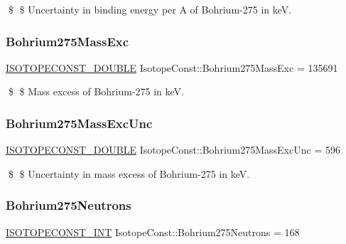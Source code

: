 \$ \$ Uncertainty in binding energy per A of Bohrium-\/275 in keV. \mbox{\label{group___isotope_const-_bohrium-_bh275_gab8ea4b53d594a17a2621b77cdd475628}} 
\subsubsection{\texorpdfstring{Bohrium275\+Mass\+Exc}{Bohrium275MassExc}}
{\footnotesize\ttfamily \mbox{\hyperlink{group___isotope_const-_macros_ga8f45a7272ce02c0b4c65c44636ed719a}{I\+S\+O\+T\+O\+P\+E\+C\+O\+N\+S\+T\+\_\+\+D\+O\+U\+B\+LE}} Isotope\+Const\+::\+Bohrium275\+Mass\+Exc = 135691}

\$ \$ Mass excess of Bohrium-\/275 in keV. \mbox{\label{group___isotope_const-_bohrium-_bh275_gad934e1fcf7061c6afb2ab21cb8b68c8e}} 
\subsubsection{\texorpdfstring{Bohrium275\+Mass\+Exc\+Unc}{Bohrium275MassExcUnc}}
{\footnotesize\ttfamily \mbox{\hyperlink{group___isotope_const-_macros_ga8f45a7272ce02c0b4c65c44636ed719a}{I\+S\+O\+T\+O\+P\+E\+C\+O\+N\+S\+T\+\_\+\+D\+O\+U\+B\+LE}} Isotope\+Const\+::\+Bohrium275\+Mass\+Exc\+Unc = 596}

\$ \$ Uncertainty in mass excess of Bohrium-\/275 in keV. \mbox{\label{group___isotope_const-_bohrium-_bh275_ga32f442d8d688634fde66a7b923caf764}} 
\subsubsection{\texorpdfstring{Bohrium275\+Neutrons}{Bohrium275Neutrons}}
{\footnotesize\ttfamily \mbox{\hyperlink{group___isotope_const-_macros_ga5f18360b3e99483a35c32d789e62621c}{I\+S\+O\+T\+O\+P\+E\+C\+O\+N\+S\+T\+\_\+\+I\+NT}} Isotope\+Const\+::\+Bohrium275\+Neutrons = 168}

